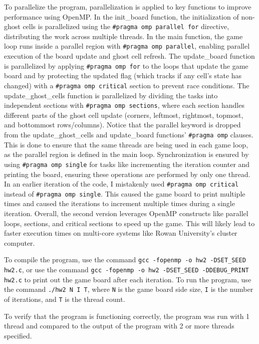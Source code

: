 \documentclass{article}
\begin{document}
	To parallelize the program, parallelization is applied to key functions to improve performance using OpenMP. In the init\_board function, the initialization of non-ghost cells is parallelized using the \texttt{\#pragma omp parallel for} directive, distributing the work across multiple threads. In the main function, the game loop runs inside a parallel region with \texttt{\#pragma omp parallel}, enabling parallel execution of the board update and ghost cell refresh. The update\_board function is parallelized by applying \texttt{\#pragma omp for} to the loops that update the game board and by protecting the updated flag (which tracks if any cell's state has changed) with a \texttt{\#pragma omp critical} section to prevent race conditions. The update\_ghost\_cells function is parallelized by dividing the tasks into independent sections with \texttt{\#pragma omp sections}, where each section handles different parts of the ghost cell update (corners, leftmost, rightmost, topmost, and bottommost rows/columns). Notice that the parallel keyword is dropped from the update\_ghost\_cells and update\_board functions’ \texttt{\#pragma omp} clauses. This is done to ensure that the same threads are being used in each game loop, as the parallel region is defined in the main loop. Synchronization is ensured by using \texttt{\#pragma omp single} for tasks like incrementing the iteration counter and printing the board, ensuring these operations are performed by only one thread. In an earlier iteration of the code, I mistakenly used \texttt{\#pragma omp critical} instead of \texttt{\#pragma omp single}. This caused the game board to print multiple times and caused the iterations to increment multiple times during a single iteration. Overall, the second version leverages OpenMP constructs like parallel loops, sections, and critical sections to speed up the game. This will likely lead to faster execution times on multi-core systems like Rowan University’s cluster computer.
	
	To compile the program, use the command \texttt{gcc -fopenmp -o hw2 -DSET\_SEED hw2.c}, or use the command \texttt{gcc -fopenmp -o hw2 -DSET\_SEED -DDEBUG\_PRINT hw2.c} to print out the game board after each iteration. To run the program, use the command \texttt{./hw2 N I T}, where \texttt{N} is the game board side size, \texttt{I} is the number of iterations, and \texttt{T} is the thread count.
	
	To verify that the program is functioning correctly, the program was run with 1 thread and compared to the output of the program with 2 or more threads specified.
\end{document}
